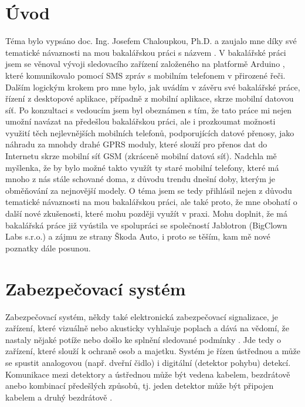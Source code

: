 \documentclass[FM,MP]{tulthesis}  %
\begin{document}
\chapter{Úvod}
Téma bylo vypsáno doc. Ing. Josefem Chaloupkou, Ph.D. a zaujalo mne díky své tematické návaznosti na mou bakalářskou práci s názvem  \cite{Bachelor thesis}. V bakalářské práci jsem se věnoval vývoji sledovacího zařízení založeného na platformě Arduino \cite{Arduino intro}, které komunikovalo pomocí SMS zpráv s mobilním telefonem v přirozené řeči. Dalším logickým krokem pro mne bylo, jak uvádím v závěru své bakalářské práce, řízení z desktopové aplikace, případně z mobilní aplikace, skrze mobilní datovou síť. Po konzultaci s vedoucím jsem byl obeznámen s tím, že tato práce mi nejen umožní navázat na předešlou bakalářskou práci, ale i prozkoumat možnosti využití těch nejlevnějších mobilních telefonů, podporujících datové přenosy, jako náhradu za mnohdy drahé GPRS moduly, které slouží pro přenos dat do Internetu skrze mobilní síť GSM (zkráceně mobilní datová síť). Nadchla mě myšlenka, že by bylo možné takto využít ty staré mobilní telefony, které má mnoho z nás stále schované doma, z důvodu trendu dnešní doby, kterým je obměňování za nejnovější modely. O téma jsem se tedy přihlásil nejen z důvodu tematické  návaznosti na mou bakalářskou práci, ale také proto, že mne obohatí o další nové zkušenosti, které mohu později využít v praxi. Mohu doplnit, že má bakalářská práce již vyústila ve spolupráci se společností Jablotron (BigClown Labs s.r.o.) a zájmu ze strany Škoda Auto, i proto se těším, kam mě nové poznatky dále posunou.

\chapter{Zabezpečovací systém}
Zabezpečovací systém, někdy také elektronická zabezpečovací signalizace, je zařízení, které vizuálně nebo akusticky vyhlašuje poplach a dává na vědomí, že nastaly nějaké potíže nebo došlo ke splnění sledované podmínky \cite{Security alarm}. Jde tedy o zařízení, které slouží k ochraně osob a majetku. Systém je řízen ústřednou a může se spustit analogovou (např. dveřní čidlo) i digitální (detektor pohybu) detekcí. Komunikace mezi detektory a ústřednou může být vedena kabelem, bezdrátově anebo kombinací předešlých způsobů, tj. jeden detektor může být připojen kabelem a druhý bezdrátově \cite{Electronic security system}.
\end{document}
